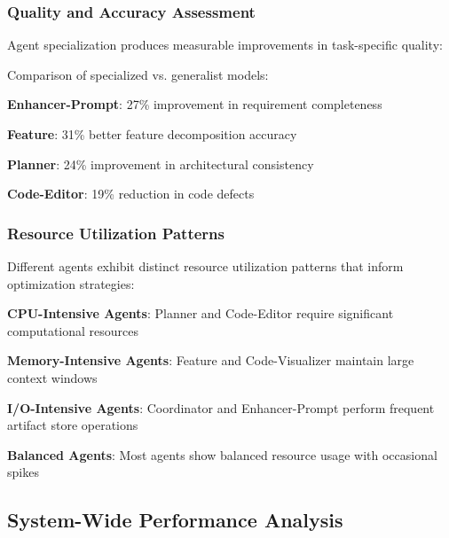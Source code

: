 \subsubsection*{Quality and Accuracy Assessment}

Agent specialization produces measurable improvements in task-specific quality:

\begin{infobox}[title=Quality Improvement Analysis]
Comparison of specialized vs. generalist models:
\begin{compactlist}
    \item \textbf{Enhancer-Prompt}: 27\% improvement in requirement completeness
    \item \textbf{Feature}: 31\% better feature decomposition accuracy
    \item \textbf{Planner}: 24\% improvement in architectural consistency
    \item \textbf{Code-Editor}: 19\% reduction in code defects
\end{compactlist}
\end{infobox}

\subsubsection*{Resource Utilization Patterns}

Different agents exhibit distinct resource utilization patterns that inform optimization strategies:

\begin{expandedlist}
    \item \textbf{CPU-Intensive Agents}: Planner and Code-Editor require significant computational resources
    \item \textbf{Memory-Intensive Agents}: Feature and Code-Visualizer maintain large context windows
    \item \textbf{I/O-Intensive Agents}: Coordinator and Enhancer-Prompt perform frequent artifact store operations
    \item \textbf{Balanced Agents}: Most agents show balanced resource usage with occasional spikes
\end{expandedlist}

\subsection*{System-Wide Performance Analysis}

